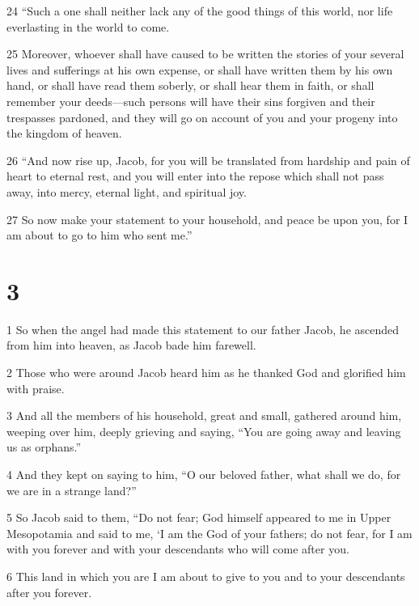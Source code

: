 \par 24 “Such a one shall neither lack any of the good things of this world, nor life everlasting in the world to come. 

\par 25 Moreover, whoever shall have caused to be written the stories of your several lives and sufferings at his own expense, or shall have written them by his own hand, or shall have read them soberly, or shall hear them in faith, or shall remember your deeds—such persons will have their sins forgiven and their trespasses pardoned, and they will go on account of you and your progeny into the kingdom of heaven. 

\par 26 “And now rise up, Jacob, for you will be translated from hardship and pain of heart to eternal rest, and you will enter into the repose which shall not pass away, into mercy, eternal light, and spiritual joy. 

\par 27 So now make your statement to your household, and peace be upon you, for I am about to go to him who sent me.” 

\chapter{3}

\par 1 So when the angel had made this statement to our father Jacob, he ascended from him into heaven, as Jacob bade him farewell. 

\par 2 Those who were around Jacob heard him as he thanked God and glorified him with praise. 

\par 3 And all the members of his household, great and small, gathered around him, weeping over him, deeply grieving and saying, “You are going away and leaving us as orphans.” 

\par 4 And they kept on saying to him, “O our beloved father, what shall we do, for we are in a strange land?”

\par 5 So Jacob said to them, “Do not fear; God himself appeared to me in Upper Mesopotamia and said to me, ‘I am the God of your fathers; do not fear, for I am with you forever and with your descendants who will come after you. 

\par 6 This land in which you are I am about to give to you and to your descendants after you forever. 

